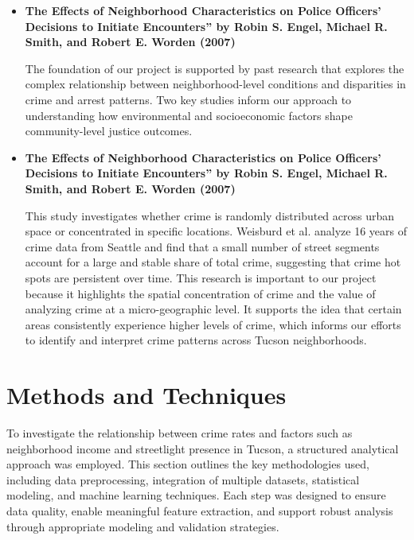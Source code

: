 \documentclass{report}
\begin{document}
	\begin{itemize}
		\item \textbf{The Effects of Neighborhood Characteristics on Police Officers’ Decisions to Initiate Encounters” by Robin S. Engel, Michael R. Smith, and Robert E. Worden (2007)} \cite{welsh08}
		\par The foundation of our project is supported by past research that explores the complex relationship between neighborhood-level conditions and disparities in crime and arrest patterns. Two key studies inform our approach to understanding how environmental and socioeconomic factors shape community-level justice outcomes.
		
		\item \textbf{The Effects of Neighborhood Characteristics on Police Officers’ Decisions to Initiate Encounters” by Robin S. Engel, Michael R. Smith, and Robert E. Worden (2007)} \cite{jr07}
		\par This study investigates whether crime is randomly distributed across urban space or concentrated in specific locations. Weisburd et al. analyze 16 years of crime data from Seattle and find that a small number of street segments account for a large and stable share of total crime, suggesting that crime hot spots are persistent over time. This research is important to our project because it highlights the spatial concentration of crime and the value of analyzing crime at a micro-geographic level. It supports the idea that certain areas consistently experience higher levels of crime, which informs our efforts to identify and interpret crime patterns across Tucson neighborhoods.
		\par 
	\end{itemize}
	
	
	\newpage
	\section{Methods and Techniques}
	
	\par To investigate the relationship between crime rates and factors such as neighborhood income and streetlight presence in Tucson, a structured analytical approach was employed. This section outlines the key methodologies used, including data preprocessing, integration of multiple datasets, statistical modeling, and machine learning techniques. Each step was designed to ensure data quality, enable meaningful feature extraction, and support robust analysis through appropriate modeling and validation strategies.
	
\end{document}
